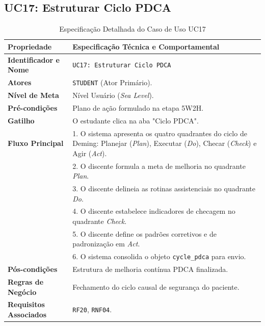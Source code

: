 \subsection{UC17: Estruturar Ciclo PDCA}
\label{uc17_especificacao}

\begin{table}[!ht]
\centering
\caption{Especificação Detalhada do Caso de Uso UC17}
\label{tab_uc17}
\footnotesize
\begin{tabularx}{\textwidth}{p{3.5cm} X}
\toprule
\textbf{Propriedade} & \textbf{Especificação Técnica e Comportamental} \\
\midrule
\textbf{Identificador e Nome} & \texttt{UC17: Estruturar Ciclo PDCA} \\
\textbf{Atores} & \texttt{STUDENT} (Ator Primário). \\
\textbf{Nível de Meta} & Nível Usuário (\textit{Sea Level}). \\
\textbf{Pré-condições} & Plano de ação formulado na etapa 5W2H. \\
\textbf{Gatilho} & O estudante clica na aba "Ciclo PDCA". \\
\textbf{Fluxo Principal} & 
1. O sistema apresenta os quatro quadrantes do ciclo de Deming: Planejar (\textit{Plan}), Executar (\textit{Do}), Checar (\textit{Check}) e Agir (\textit{Act}).\\
& 2. O discente formula a meta de melhoria no quadrante \textit{Plan}.\\
& 3. O discente delineia as rotinas assistenciais no quadrante \textit{Do}.\\
& 4. O discente estabelece indicadores de checagem no quadrante \textit{Check}.\\
& 5. O discente define os padrões corretivos e de padronização em \textit{Act}.\\
& 6. O sistema consolida o objeto \texttt{cycle\_pdca} para envio. \\
\textbf{Pós-condições} & Estrutura de melhoria contínua PDCA finalizada. \\
\textbf{Regras de Negócio} & Fechamento do ciclo causal de segurança do paciente. \\
\textbf{Requisitos Associados} & \texttt{RF20}, \texttt{RNF04}. \\
\bottomrule
\end{tabularx}
\end{table}

